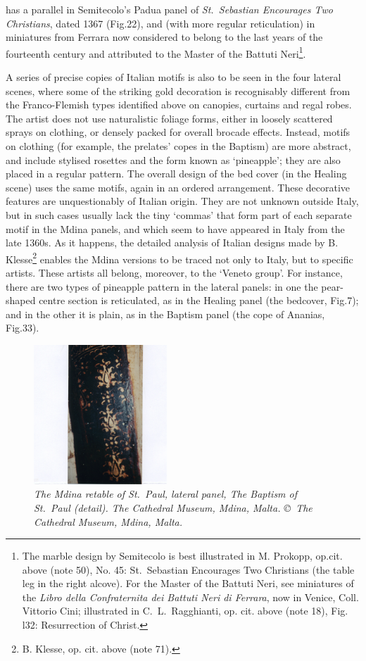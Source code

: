 \documentclass[a4paper,12pt]{article}
\begin{document}
has a parallel in Semitecolo's Padua panel of \textit{St.~Sebastian
Encourages Two Christians}, dated 1367 (Fig.22), and (with more
regular reticulation) in miniatures from Ferrara now considered to
belong to the last years of the fourteenth century and attributed to
the Master of the Battuti Neri\footnote{The marble design by
Semitecolo is best illustrated in M. Prokopp, op.cit. above (note 50),
No. 45: St.~Sebastian Encourages Two Christians (the table leg in the
right alcove).  For the Master of the Battuti Neri, see miniatures of
the \textit{Libro della Confraternita dei Battuti Neri di Ferrara},
now in Venice, Coll. Vittorio Cini; illustrated in C.~L.~Ragghianti,
op. cit. above (note 18), Fig. l32: Resurrection of Christ.}.

A series of precise copies of Italian motifs is also to be seen in the
four lateral scenes, where some of the striking gold decoration is
recognisably different from the Franco-Flemish types identified above
on canopies, curtains and regal robes. The artist does not use
naturalistic foliage forms, either in loosely scattered sprays on
clothing, or densely packed for overall brocade effects.  Instead,
motifs on clothing (for example, the prelates' copes in the Baptism)
are more abstract, and include stylised rosettes and the form known as
`pineapple'; they are also placed in a regular pattern. The overall
design of the bed cover (in the Healing scene) uses the same motifs,
again in an ordered arrangement. These decorative features are
unquestionably of Italian origin. They are not unknown outside Italy,
but in such cases usually lack the tiny `commas' that form part of
each separate motif in the Mdina panels, and which seem to have
appeared in Italy from the late 1360s. As it happens, the detailed
analysis of Italian designs made by B. Klesse\footnote{B. Klesse,
op. cit. above (note 71).} enables the Mdina versions to be traced not
only to Italy, but to specific artists.  These artists all belong,
moreover, to the `Veneto group'. For instance, there are two types of
pineapple pattern in the lateral panels: in one the pear-shaped centre
section is reticulated, as in the Healing panel (the bedcover, Fig.7);
and in the other it is plain, as in the Baptism panel (the cope of
Ananias, Fig.33). 
\begin{figure}[htbp]
\centering
\includegraphics[width=5cm]{pics/fig33.png}
\caption[The Mdina retable of St.~Paul, lateral panel, The Baptism of
  St.~Paul (detail).]  
{\it The Mdina retable of St.~Paul, lateral panel, The Baptism of
  St.~Paul (detail).
The Cathedral Museum, Mdina, Malta. \copyright\ The Cathedral Museum,
  Mdina, Malta.} 
\end{figure}
\end{document}
